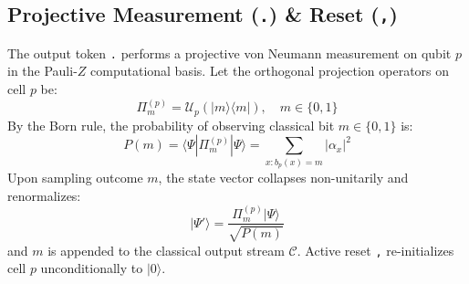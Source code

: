 \documentclass[11pt,a4paper,twocolumn]{article}
\newcommand{\bra}[1]{\langle #1 |}
\newcommand{\ket}[1]{| #1 \rangle}
\newcommand{\ketbra}[2]{| #1 \rangle\langle #2 |}
\begin{document}
\subsection{Projective Measurement (\texttt{.}) \& Reset (\texttt{,})}
The output token \texttt{.} performs a projective von Neumann measurement on qubit $p$ in the Pauli-$Z$ computational basis. Let the orthogonal projection operators on cell $p$ be:
\begin{equation}
    \Pi_m^{(p)} = \mathcal{U}_p(\ketbra{m}{m}), \quad m \in \{0, 1\}
\end{equation}
By the Born rule, the probability of observing classical bit $m \in \{0, 1\}$ is:
\begin{equation}
    P(m) = \bra{\Psi} \Pi_m^{(p)} \ket{\Psi} = \sum_{x : b_p(x) = m} |\alpha_x|^2
\end{equation}
Upon sampling outcome $m$, the state vector collapses non-unitarily and renormalizes:
\begin{equation}
    \ket{\Psi'} = \frac{\Pi_m^{(p)} \ket{\Psi}}{\sqrt{P(m)}}
\end{equation}
and $m$ is appended to the classical output stream $\mathcal{C}$. Active reset \texttt{,} re-initializes cell $p$ unconditionally to $\ket{0}$.
\end{document}
